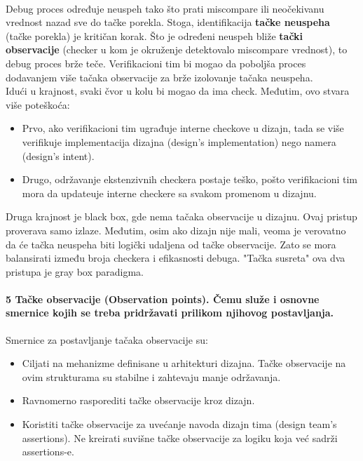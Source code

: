 \documentclass[a4paper, 12pt]{article}
\begin{document}
\\\indent Debug proces određuje neuspeh tako što prati miscompare ili neočekivanu vrednost nazad sve do tačke porekla. Stoga, identifikacija \textbf{tačke neuspeha} (tačke porekla) je kritičan korak. Što je određeni neuspeh bliže \textbf{tački observacije} (checker u kom je okruženje detektovalo miscompare vrednost), to debug proces brže teče. Verifikacioni tim bi mogao da poboljša proces dodavanjem više tačaka observacije za brže izolovanje tačaka neuspeha.\\
\indent Idući u krajnost, svaki čvor u kolu bi mogao da ima check. Međutim, ovo stvara više poteškoća:
\begin{itemize}
\item Prvo, ako verifikacioni tim ugrađuje interne checkove u dizajn, tada se više verifikuje implementacija dizajna (design's implementation) nego namera (design's intent).
\item Drugo, održavanje ekstenzivnih checkera postaje teško, pošto verifikacioni tim mora da updateuje interne checkere sa svakom promenom u dizajnu.
\end{itemize}
\indent Druga krajnost je black box, gde nema tačaka observacije u dizajnu. Ovaj pristup proverava samo izlaze. Međutim, osim ako dizajn nije mali, veoma je verovatno da će tačka neuspeha biti logički udaljena od tačke observacije. Zato se mora balansirati između broja checkera i efikasnosti debuga. "Tačka susreta" ova dva pristupa je gray box paradigma.
\paragraph{5 Tačke observacije (Observation points). Čemu služe i osnovne smernice kojih se treba pridržavati prilikom njihovog postavljanja.}
\hfill \break
\indent Smernice za postavljanje tačaka observacije su:
\begin{itemize}
\item Ciljati na mehanizme definisane u arhitekturi dizajna. Tačke observacije na ovim strukturama su stabilne i zahtevaju manje održavanja.
\item Ravnomerno rasporediti tačke observacije kroz dizajn.
\item Koristiti tačke observacije za uvećanje navoda dizajn tima (design team's assertions). Ne kreirati suvišne tačke observacije za logiku koja već sadrži assertions-e.
\end{itemize}
\end{document}
